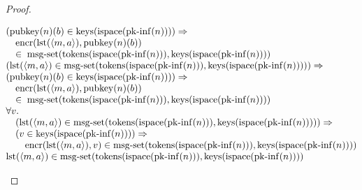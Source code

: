 \documentclass[11pt]{article}
\theoremstyle{plain}
\begin{document}
\begin{proof}
\begin{itemize}[leftmargin=2.8em, itemsep=4pt, parsep=1pt]
\begin{itemize}[leftmargin=2.8em, itemsep=4pt, parsep=1pt]
\begin{equation*}
\begin{array}{@{}l@{}}
\begin{array}{@{}l@{}} (\operatorname{pubkey}(n)(b) \in \operatorname{keys}(\operatorname{ispace}(\operatorname{pk\text{-}inf}(n)))) \Rightarrow  \\ \quad \operatorname{encr}(\operatorname{lst}(\langle m, a \rangle), \operatorname{pubkey}(n)(b)) \\ \quad \in\; \operatorname{msg\text{-}set}(\operatorname{tokens}(\operatorname{ispace}(\operatorname{pk\text{-}inf}(n))), \operatorname{keys}(\operatorname{ispace}(\operatorname{pk\text{-}inf}(n)))) \end{array} \\
\begin{array}{@{}l@{}} (\operatorname{lst}(\langle m, a \rangle) \in \operatorname{msg\text{-}set}(\operatorname{tokens}(\operatorname{ispace}(\operatorname{pk\text{-}inf}(n))), \operatorname{keys}(\operatorname{ispace}(\operatorname{pk\text{-}inf}(n))))) \Rightarrow  \\ (\operatorname{pubkey}(n)(b) \in \operatorname{keys}(\operatorname{ispace}(\operatorname{pk\text{-}inf}(n)))) \Rightarrow  \\ \quad \operatorname{encr}(\operatorname{lst}(\langle m, a \rangle), \operatorname{pubkey}(n)(b)) \\ \quad \in\; \operatorname{msg\text{-}set}(\operatorname{tokens}(\operatorname{ispace}(\operatorname{pk\text{-}inf}(n))), \operatorname{keys}(\operatorname{ispace}(\operatorname{pk\text{-}inf}(n)))) \end{array} \\
\begin{array}{@{}l@{}} \forall v. \\ \quad (\operatorname{lst}(\langle m, a \rangle) \in \operatorname{msg\text{-}set}(\operatorname{tokens}(\operatorname{ispace}(\operatorname{pk\text{-}inf}(n))), \operatorname{keys}(\operatorname{ispace}(\operatorname{pk\text{-}inf}(n))))) \Rightarrow  \\ \quad (v \in \operatorname{keys}(\operatorname{ispace}(\operatorname{pk\text{-}inf}(n)))) \Rightarrow  \\ \quad \quad \operatorname{encr}(\operatorname{lst}(\langle m, a \rangle), v) \in \operatorname{msg\text{-}set}(\operatorname{tokens}(\operatorname{ispace}(\operatorname{pk\text{-}inf}(n))), \operatorname{keys}(\operatorname{ispace}(\operatorname{pk\text{-}inf}(n)))) \end{array} \\
\operatorname{lst}(\langle m, a \rangle) \in \operatorname{msg\text{-}set}(\operatorname{tokens}(\operatorname{ispace}(\operatorname{pk\text{-}inf}(n))), \operatorname{keys}(\operatorname{ispace}(\operatorname{pk\text{-}inf}(n)))) \\

\end{array}
\end{equation*}
\end{itemize}
\end{itemize}
\end{proof}
\end{document}
